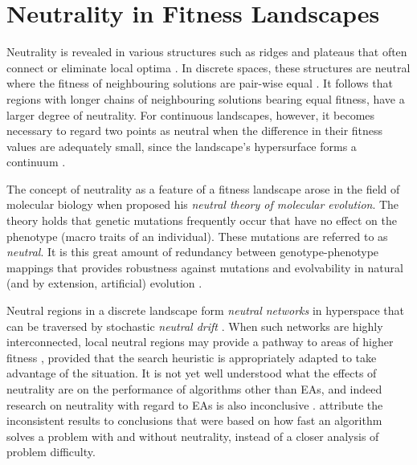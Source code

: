 \documentclass[conference]{IEEEtran}
\begin{document}
\section{Neutrality in Fitness Landscapes}
\label{backgroundNeutralityFL}
Neutrality is revealed in various structures such as ridges and plateaus that often connect or eliminate local optima \cite{owen2007adapting}. In discrete spaces, these structures are neutral where the fitness of neighbouring solutions are pair-wise equal \cite{reidys2001neutrality}. It follows that regions with longer chains of neighbouring solutions bearing equal fitness, have a larger degree of neutrality. For continuous landscapes, however, it becomes necessary to regard two points as neutral when the difference in their fitness values are adequately small, since the landscape's hypersurface forms a continuum \cite{izquierdo2004evolving}.

The concept of neutrality as a feature of a fitness landscape arose in the field of molecular biology when \citet{kimura1984neutral} proposed his \textit{neutral theory of molecular evolution}. The theory holds that genetic mutations frequently occur that have no effect on the phenotype (macro traits of an individual). These mutations are referred to as \textit{neutral}. It is this great amount of redundancy between genotype-phenotype mappings that provides robustness against mutations \cite{wilke2001evolution,wagner2005robustness} and evolvability \cite{wagner2005robustness} in natural (and by extension, artificial) evolution \cite{huynen1996smoothness}. 

Neutral regions in a discrete landscape form \textit{neutral networks} in hyperspace that can be traversed by stochastic \textit{neutral drift} \cite{katada2003measuring}. When such networks are highly interconnected, local neutral regions may provide a pathway to areas of higher fitness \cite{katada2003measuring}, provided that the search heuristic is appropriately adapted to take advantage of the situation. It is not yet well understood what the effects of neutrality are on the performance of algorithms other than EAs, and indeed research on neutrality with regard to EAs is also inconclusive \cite{galvan2011neutrality}. \citet{galvan2011neutrality} attribute the inconsistent results to conclusions that were based on how fast an algorithm solves a problem with and without neutrality, instead of a closer analysis of problem difficulty.
\end{document}
